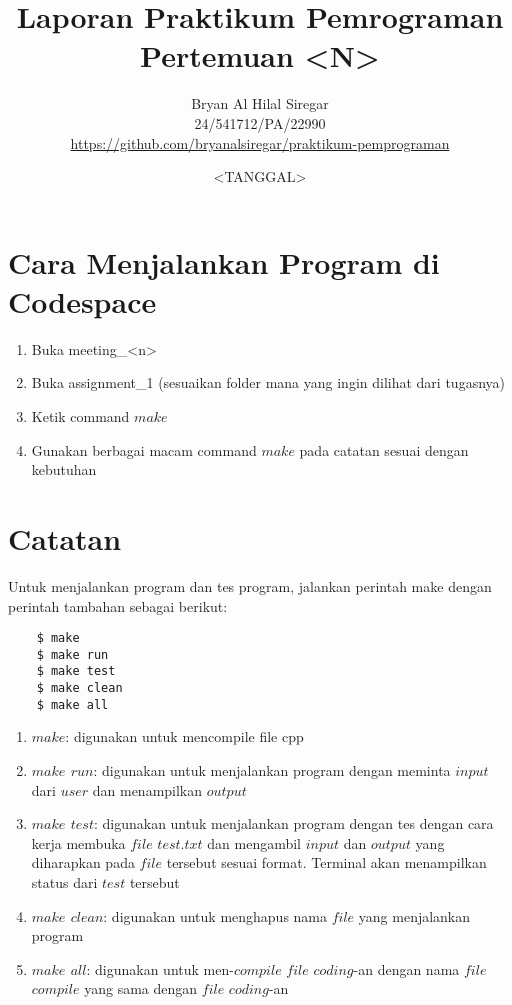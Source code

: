 \documentclass{article}
\title{Laporan Praktikum Pemrograman\\Pertemuan <N>}
\author{Bryan Al Hilal Siregar\\ 24/541712/PA/22990\\ \href{https://github.com/bryanalsiregar/praktikum-pemprograman}{https://github.com/bryanalsiregar/praktikum-pemprograman}}
\date{<TANGGAL>}
\begin{document}
\maketitle

\section{Cara Menjalankan Program di Codespace}
\begin{enumerate}
    \item Buka meeting\_<n>
    \item Buka assignment\_1 (sesuaikan folder mana yang ingin dilihat dari tugasnya)
    \item Ketik command $make$
    \item Gunakan berbagai macam command $make$ pada catatan sesuai dengan kebutuhan
\end{enumerate}

\section{Catatan}

Untuk menjalankan program dan tes program, jalankan perintah make dengan perintah tambahan sebagai berikut:
\begin{verbatim}
    $ make
    $ make run
    $ make test
    $ make clean 
    $ make all
\end{verbatim}

\begin{enumerate}
    \item \textbf{$make$}: digunakan untuk mencompile file cpp
    \item \textbf{$make$ $run$}: digunakan untuk menjalankan program dengan meminta $input$ dari $user$ dan menampilkan $output$
    \item \textbf{$make$ $test$}: digunakan untuk menjalankan program dengan tes dengan cara kerja membuka $file$ $test.txt$ dan mengambil $input$ dan $output$ yang diharapkan pada $file$ tersebut sesuai format. Terminal akan menampilkan status dari $test$ tersebut
    \item \textbf{$make$ $clean$}: digunakan untuk menghapus nama $file$ yang menjalankan program
    \item \textbf{$make$ $all$}: digunakan untuk men-$compile$ $file$ $coding$-an dengan nama $file$ $compile$ yang sama dengan $file$ $coding$-an
\end{enumerate}
\end{document}

